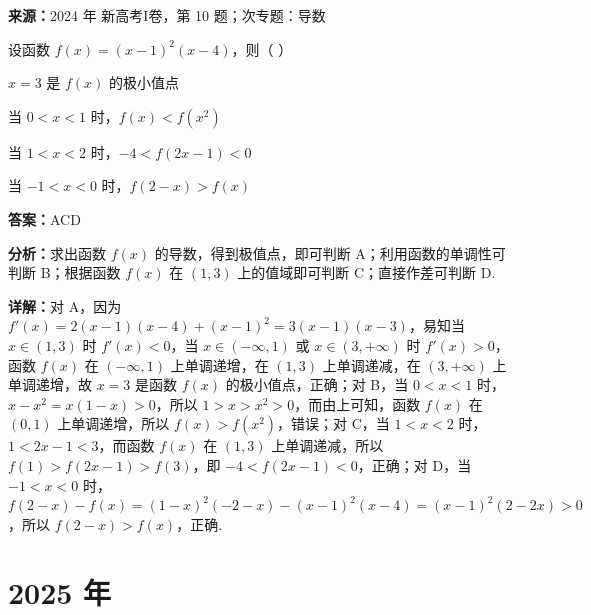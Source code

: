 \begin{question}[points=6]
\textbf{来源：}2024 年 新高考I卷，第 10 题；次专题：导数\par
设函数 $f(x)=(x-1)^2(x-4)$，则（ ）
\begin{choices}
  \item $x=3$ 是 $f(x)$ 的极小值点
  \item 当 $0<x<1$ 时，$f(x)<f(x^2)$
  \item 当 $1<x<2$ 时，$-4<f(2x-1)<0$
  \item 当 $-1<x<0$ 时，$f(2-x)>f(x)$
\end{choices}
\begin{solution}
\textbf{答案：}ACD

\textbf{分析：}求出函数 $f(x)$ 的导数，得到极值点，即可判断 A；利用函数的单调性可判断 B；根据函数 $f(x)$ 在 $(1,3)$ 上的值域即可判断 C；直接作差可判断 D.

\textbf{详解：}对 A，因为 $f'(x)=2(x-1)(x-4)+(x-1)^2=3(x-1)(x-3)$，易知当 $x\in(1,3)$ 时 $f'(x)<0$，当 $x\in(-\infty,1)$ 或 $x\in(3,+\infty)$ 时 $f'(x)>0$，函数 $f(x)$ 在 $(-\infty,1)$ 上单调递增，在 $(1,3)$ 上单调递减，在 $(3,+\infty)$ 上单调递增，故 $x=3$ 是函数 $f(x)$ 的极小值点，正确；对 B，当 $0<x<1$ 时，$x-x^2=x(1-x)>0$，所以 $1>x>x^2>0$，而由上可知，函数 $f(x)$ 在 $(0,1)$ 上单调递增，所以 $f(x)>f(x^2)$，错误；对 C，当 $1<x<2$ 时，$1<2x-1<3$，而函数 $f(x)$ 在 $(1,3)$ 上单调递减，所以 $f(1)>f(2x-1)>f(3)$，即 $-4<f(2x-1)<0$，正确；对 D，当 $-1<x<0$ 时，$f(2-x)-f(x)=(1-x)^2(-2-x)-(x-1)^2(x-4)=(x-1)^2(2-2x)>0$，所以 $f(2-x)>f(x)$，正确.
\end{solution}
\end{question}

\section*{2025 年}

